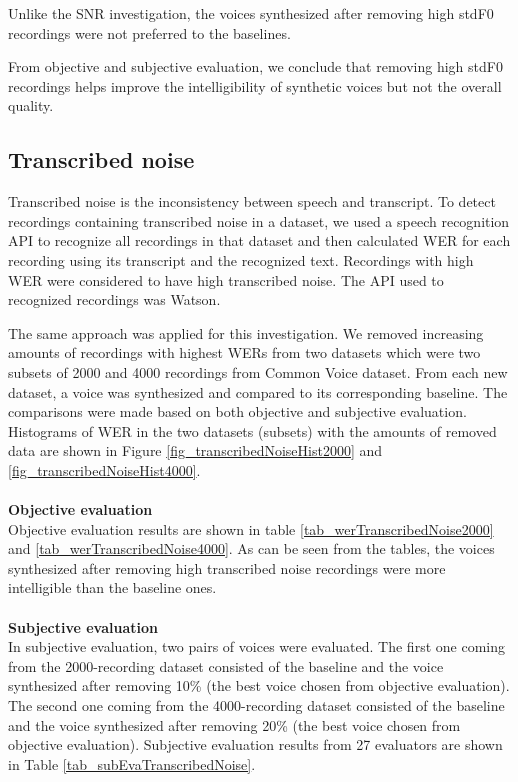 \documentclass[12pt]{article}
\begin{document}
Unlike the SNR investigation, the voices synthesized after removing high stdF0 recordings were not preferred to the baselines.

From objective and subjective evaluation, we conclude that removing high stdF0 recordings helps improve the intelligibility of synthetic voices but not the overall quality.

\subsection{Transcribed noise}
Transcribed noise is the inconsistency between speech and transcript. To detect recordings containing transcribed noise in a dataset, we used a speech recognition API to recognize all recordings in that dataset and then calculated WER for each recording using its transcript and the recognized text. Recordings with high WER were considered to have high transcribed noise. The API used to recognized recordings was Watson.

The same approach was applied for this investigation. We removed increasing amounts of recordings with highest WERs from two datasets which were two subsets of 2000 and 4000 recordings from Common Voice dataset. From each new dataset, a voice was synthesized and compared to its corresponding baseline. The comparisons were made based on both objective and subjective evaluation. Histograms of WER in the two datasets (subsets) with the amounts of removed data are shown in Figure \ref{fig_transcribedNoiseHist2000} and \ref{fig_transcribedNoiseHist4000}.\\\\
\textbf{Objective evaluation}
\vspace{0.28cm}\\
Objective evaluation results are shown in table \ref{tab_werTranscribedNoise2000} and \ref{tab_werTranscribedNoise4000}. As can be seen from the tables, the voices synthesized after removing high transcribed noise recordings were more intelligible than the baseline ones.\\\\
\textbf{Subjective evaluation}
\vspace{0.28cm}\\
In subjective evaluation, two pairs of voices were evaluated. The first one coming from the 2000-recording dataset consisted of the baseline and the voice synthesized after removing 10\% (the best voice chosen from objective evaluation). The second one coming from the 4000-recording dataset consisted of the baseline and the voice synthesized after removing 20\% (the best voice chosen from objective evaluation). Subjective evaluation results from 27 evaluators are shown in Table \ref{tab_subEvaTranscribedNoise}.
\end{document}
